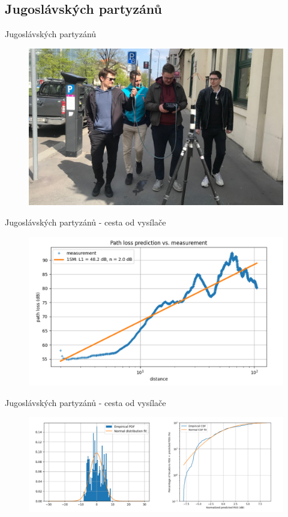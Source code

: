 \documentclass[aspectratio=169, 12pt, hyperref={unicode}]{beamer}
\begin{document}
\subsection{Jugoslávských partyzánů}
\begin{frame}{Jugoslávských partyzánů}
	\begin{figure}[!ht]
		\centering
		\includegraphics[width=.7\textwidth]{src/fotka-skupina.jpg}
	\end{figure}
\end{frame}
\begin{frame}{Jugoslávských partyzánů - cesta od vysílače}
	\begin{figure}[!ht]
		\centering
		\includegraphics[width=.75\textwidth]{src/partyzanu-od-vysilace-1.png}
	\end{figure}
\end{frame}
\begin{frame}{Jugoslávských partyzánů - cesta od vysílače}
	\begin{figure}[!ht]
		\centering
		\includegraphics[width=\textwidth]{src/partyzanu-od-vysilace-2.png}
	\end{figure}
\end{frame}
\end{document}
